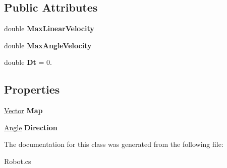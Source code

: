 \subsection*{Public Attributes}
\begin{DoxyCompactItemize}
\item 
\hypertarget{class_console_application2_1_1_robot_a6277f34887e3e69c1c0d5005d5ac4a77}{}double {\bfseries Max\+Linear\+Velocity}\label{class_console_application2_1_1_robot_a6277f34887e3e69c1c0d5005d5ac4a77}

\item 
\hypertarget{class_console_application2_1_1_robot_a54f03f16f68207310a7fa5802e4e79df}{}double {\bfseries Max\+Angle\+Velocity}\label{class_console_application2_1_1_robot_a54f03f16f68207310a7fa5802e4e79df}

\item 
\hypertarget{class_console_application2_1_1_robot_a53deff1dfc010f58428cf333d157736a}{}double {\bfseries Dt} = 0.\label{class_console_application2_1_1_robot_a53deff1dfc010f58428cf333d157736a}

\end{DoxyCompactItemize}
\subsection*{Properties}
\begin{DoxyCompactItemize}
\item 
\hypertarget{class_console_application2_1_1_robot_a9ddb6c004833053f0dc1d42bc9e026c0}{}\hyperlink{class_console_application2_1_1_vector}{Vector} {\bfseries Map}\label{class_console_application2_1_1_robot_a9ddb6c004833053f0dc1d42bc9e026c0}

\item 
\hypertarget{class_console_application2_1_1_robot_aa1bb2a94ddd0268ff7138bdcca7eddc8}{}\hyperlink{class_console_application2_1_1_angle}{Angle} {\bfseries Direction}\label{class_console_application2_1_1_robot_aa1bb2a94ddd0268ff7138bdcca7eddc8}

\end{DoxyCompactItemize}


The documentation for this class was generated from the following file\+:\begin{DoxyCompactItemize}
\item 
Robot.\+cs\end{DoxyCompactItemize}
